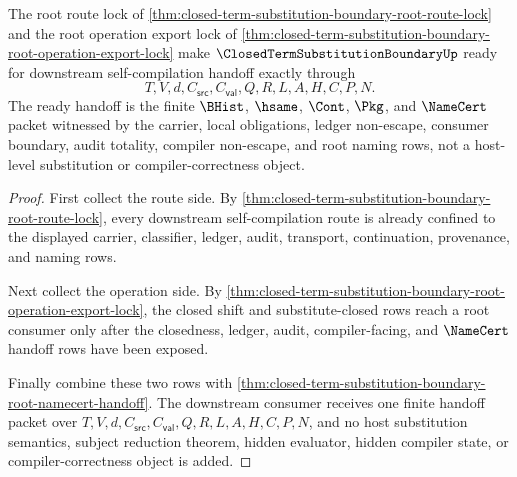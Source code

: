 \begin{theorem}
\label{thm:closed-term-substitution-boundary-root-self-compile-handoff-readiness}
The root route lock of \autoref{thm:closed-term-substitution-boundary-root-route-lock} and the root operation export lock of \autoref{thm:closed-term-substitution-boundary-root-operation-export-lock} make $\ClosedTermSubstitutionBoundaryUp$ ready for downstream self-compilation handoff exactly through
$$
T,V,d,C_{\mathsf{src}},C_{\mathsf{val}},Q,R,L,A,H,C,P,N.
$$
The ready handoff is the finite $\BHist$, $\hsame$, $\Cont$, $\Pkg$, and $\NameCert$ packet witnessed by the carrier, local obligations, ledger non-escape, consumer boundary, audit totality, compiler non-escape, and root naming rows, not a host-level substitution or compiler-correctness object.
\end{theorem}
\begin{proof}
First collect the route side. By \autoref{thm:closed-term-substitution-boundary-root-route-lock}, every downstream self-compilation route is already confined to the displayed carrier, classifier, ledger, audit, transport, continuation, provenance, and naming rows.

Next collect the operation side. By \autoref{thm:closed-term-substitution-boundary-root-operation-export-lock}, the closed shift and substitute-closed rows reach a root consumer only after the closedness, ledger, audit, compiler-facing, and $\NameCert$ handoff rows have been exposed.

Finally combine these two rows with \autoref{thm:closed-term-substitution-boundary-root-namecert-handoff}. The downstream consumer receives one finite handoff packet over $T,V,d,C_{\mathsf{src}},C_{\mathsf{val}},Q,R,L,A,H,C,P,N$, and no host substitution semantics, subject reduction theorem, hidden evaluator, hidden compiler state, or compiler-correctness object is added.
\end{proof}

